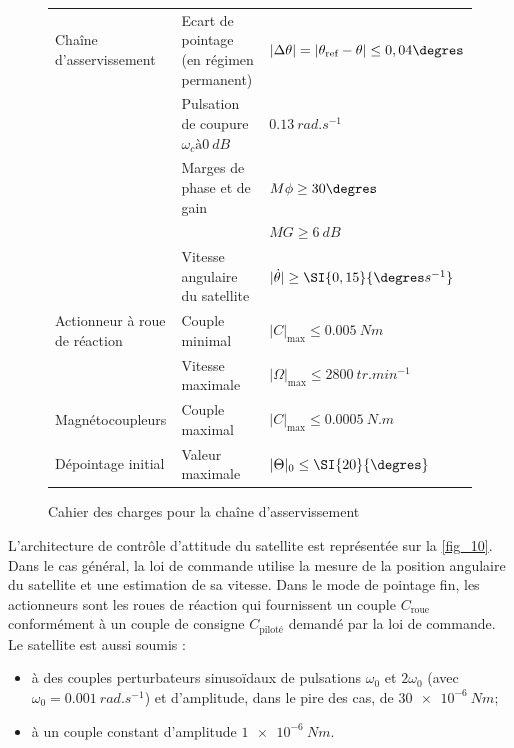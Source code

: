 \begin{figure}[H]
\centering
\begin{tabular}{|p{.25\linewidth}|p{.35\linewidth}|p{.3\linewidth}|}
\hline
Chaîne d'asservissement & Ecart de pointage (en régimen permanent) & $| \Delta \theta | = | \theta_{\text{ref}}-\theta |\leq 0,04\degres$ \\
\cline{2-3}
& Pulsation de coupure $\omega_c à \SI{0}{dB}$ & $\SI{0,13}{rad.s^{-1}}$ \\ \cline{2-3}
& Marges de phase et de gain & $M\phi \geq 30\degres$ \\ \cline{2-3}
& & $MG \geq \SI{6}{dB}$ \\ \cline{2-3}
& Vitesse angulaire du satellite & $|\dot{\theta} | \geq  \SI{0,15}{\degres s^{-1}}$ \\ \hline
Actionneur à roue de réaction & Couple minimal & $|C|_{\text{max}} \leq \SI{0,005}{Nm}$ \\ \cline{2-3}
& Vitesse maximale & $|\Omega|_{\text{max}} \leq \SI{2800}{tr.min^{-1}}$ \\ \hline
Magnétocoupleurs & Couple maximal & $|C|_{\text{max}} \leq \SI{0,0005}{N.m}$ \\ \hline
Dépointage initial & Valeur maximale & $|\Theta|_{0} \leq \SI{20}{\degres}$ \\ 
\hline
\end{tabular}
\caption{Cahier des charges pour la chaîne d’asservissement \label{fig_09}}

\end{figure}

L’architecture de contrôle d’attitude du satellite est représentée sur la \autoref{fig_10}. Dans le cas général, la loi de
commande utilise la mesure de la position angulaire du satellite et une estimation de sa vitesse. Dans le mode
de pointage fin, les actionneurs sont les roues de réaction qui fournissent un couple $C_{\text{roue}}$ conformément à un
couple de consigne $C_{\text{piloté}}$ demandé par la loi de commande. Le satellite est aussi soumis :
\begin{itemize}
\item à des couples perturbateurs sinusoïdaux de pulsations $\omega_0$ et $2\omega_{0}$ (avec $\omega_0 = \SI{0,001}{rad.s^{-1}}$) et d’amplitude,
dans le pire des cas, de $\SI{30e-6}{Nm}$;
\item à un couple constant d’amplitude $\SI{1e-6}{Nm}$.
\end{itemize}

